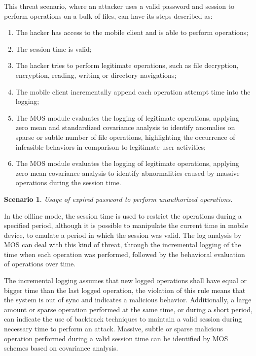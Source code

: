 \documentclass[twocolumn]{svjour3}          	%
\newtheorem{thm}{Scenario}
\begin{document}
This threat scenario, where an attacker uses a valid password and session to perform operations on a bulk of files, can have its steps described as:

\begin{enumerate}[label=(\alph*)]
	\item The hacker has access to the mobile client and is able to perform operations;
	\item The session time is valid;
	\item The hacker tries to perform legitimate operations, such as file decryption, encryption, reading, writing or directory navigations;
	\item The mobile client incrementally append each operation attempt time into the logging;
	\item The MOS module evaluates the logging of legitimate operations, applying zero mean and standardized covariance analysis to identify anomalies on sparse or subtle number of file operations, highlighting the occurrence of infeasible behaviors in comparison to legitimate user activities;
	\item The MOS module evaluates the logging of legitimate operations, applying zero mean covariance analysis to identify abnormalities caused by massive operations during the session time.
\end{enumerate}

\begin{thm}
Usage of expired password to perform unauthorized operations.
\end{thm}

In the offline mode, the session time is used to restrict the operations during a specified period, although it is possible to manipulate the current time in mobile device, to emulate a period in which the session was valid. The log analysis by MOS can deal with this kind of threat, through the incremental logging of the time when each operation was performed, followed by the behavioral evaluation of operations over time. 

The incremental logging assumes that new logged operations shall have equal or bigger time than the last logged operation, the violation of this rule means that the system is out of sync and indicates a malicious behavior. Additionally, a large amount or sparse operation performed at the same time, or during a short period, can indicate the use of backtrack techniques to maintain a valid session during necessary time to perform an attack. Massive, subtle or sparse malicious operation performed during a valid session time can be identified by MOS schemes based on covariance analysis.
\end{document}
